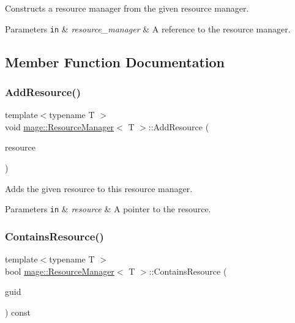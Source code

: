 Constructs a resource manager from the given resource manager.


\begin{DoxyParams}[1]{Parameters}
\mbox{\tt in}  & {\em resource\+\_\+manager} & A reference to the resource manager. \\
\hline
\end{DoxyParams}


\subsection{Member Function Documentation}
\hypertarget{classmage_1_1_resource_manager_a2f080e5351d7d9a5db939e457300c232}{}\label{classmage_1_1_resource_manager_a2f080e5351d7d9a5db939e457300c232} 
\subsubsection{\texorpdfstring{Add\+Resource()}{AddResource()}}
{\footnotesize\ttfamily template$<$typename T $>$ \\
void \hyperlink{classmage_1_1_resource_manager}{mage\+::\+Resource\+Manager}$<$ T $>$\+::Add\+Resource (\begin{DoxyParamCaption}\item[{\hyperlink{namespacemage_a1e01ae66713838a7a67d30e44c67703e}{Shared\+Ptr}$<$ T $>$}]{resource }\end{DoxyParamCaption})}

Adds the given resource to this resource manager.


\begin{DoxyParams}[1]{Parameters}
\mbox{\tt in}  & {\em resource} & A pointer to the resource. \\
\hline
\end{DoxyParams}
\hypertarget{classmage_1_1_resource_manager_aa1af191388a63700e7ef203c5e4e84ca}{}\label{classmage_1_1_resource_manager_aa1af191388a63700e7ef203c5e4e84ca} 
\subsubsection{\texorpdfstring{Contains\+Resource()}{ContainsResource()}}
{\footnotesize\ttfamily template$<$typename T $>$ \\
bool \hyperlink{classmage_1_1_resource_manager}{mage\+::\+Resource\+Manager}$<$ T $>$\+::Contains\+Resource (\begin{DoxyParamCaption}\item[{const wstring \&}]{guid }\end{DoxyParamCaption}) const}

